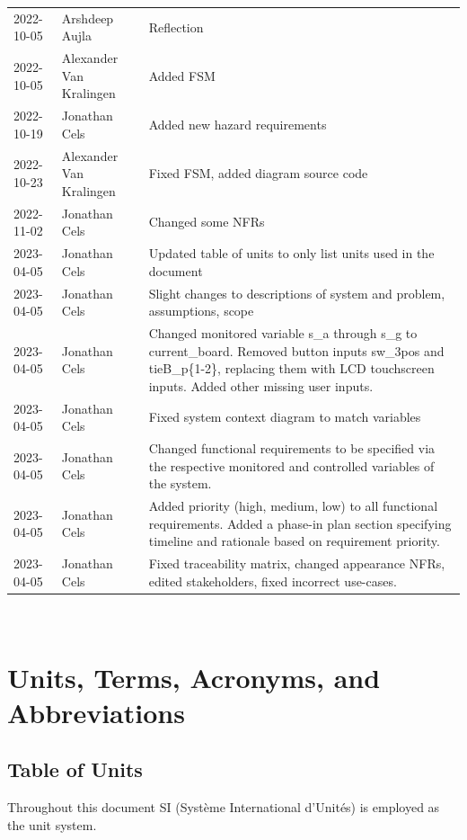 \documentclass[12pt]{article}
\begin{document}
\begin{center}
\begin{longtable}{m{2.5cm} m{5cm} m{7cm}}
    2022-10-05 & Arshdeep Aujla & Reflection\\
    2022-10-05 & Alexander Van Kralingen & Added FSM\\
    2022-10-19 & Jonathan Cels & Added new hazard requirements\\
    2022-10-23 & Alexander Van Kralingen & Fixed FSM, added diagram source code\\
    2022-11-02 & Jonathan Cels & Changed some NFRs\\
    2023-04-05 & Jonathan Cels & Updated table of units to only list units used in the document\\
    2023-04-05 & Jonathan Cels & Slight changes to descriptions of system and problem, assumptions, scope\\ 
    2023-04-05 & Jonathan Cels & Changed monitored variable s\_a through s\_g to current\_board. Removed button inputs sw\_3pos and tieB\_p\{1-2\}, replacing them with LCD touchscreen inputs. Added other missing user inputs.\\
    2023-04-05 & Jonathan Cels & Fixed system context diagram to match variables\\
    2023-04-05 & Jonathan Cels & Changed functional requirements to be specified via the respective monitored and controlled variables of the system.\\
    2023-04-05 & Jonathan Cels & Added priority (high, medium, low) to all functional requirements. Added a phase-in plan section specifying timeline and rationale based on requirement priority.\\
    2023-04-05 & Jonathan Cels & Fixed traceability matrix, changed appearance NFRs, edited stakeholders, fixed incorrect use-cases.\\
    \end{longtable}
\end{center}

~\newpage

\section{Units, Terms, Acronyms, and Abbreviations}

\subsection{Table of Units}
Throughout this document SI (Syst\`{e}me International d'Unit\'{e}s) is employed
as the unit system.
\end{document}
